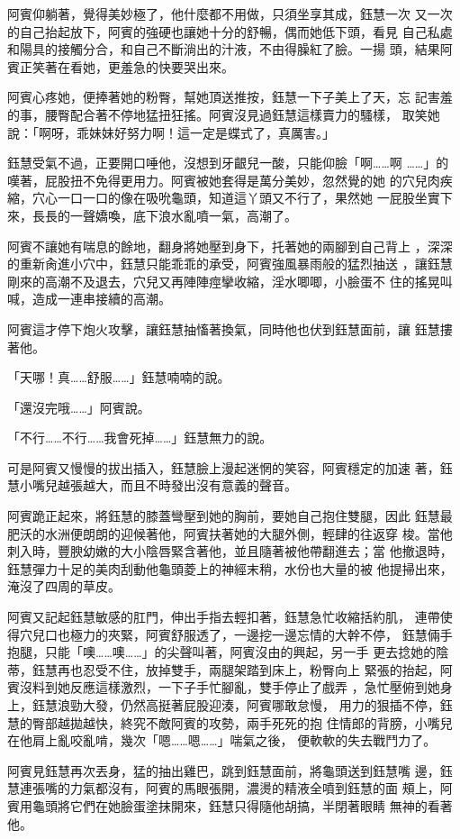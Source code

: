 阿賓仰躺著，覺得美妙極了，他什麼都不用做，只須坐享其成，鈺慧一次
又一次的自己抬起放下，阿賓的強硬也讓她十分的舒暢，偶而她低下頭，看見
自己私處和陽具的接觸分合，和自己不斷淌出的汁液，不由得臊紅了臉。一揚
頭，結果阿賓正笑著在看她，更羞急的快要哭出來。

阿賓心疼她，便捧著她的粉臀，幫她頂送推按，鈺慧一下子美上了天，忘
記害羞的事，腰臀配合著不停地猛扭狂搖。阿賓沒見過鈺慧這樣賣力的騷樣，
取笑她說：「啊呀，乖妹妹好努力啊！這一定是蝶式了，真厲害。」

鈺慧受氣不過，正要開口唾他，沒想到牙齦兒一酸，只能仰臉「啊……啊
……」的嘆著，屁股扭不免得更用力。阿賓被她套得是萬分美妙，忽然覺的她
的穴兒肉疾縮，穴心一口一口的像在吸吮龜頭，知道這丫頭又不行了，果然她
一屁股坐實下來，長長的一聲嬌喚，底下浪水亂噴一氣，高潮了。

阿賓不讓她有喘息的餘地，翻身將她壓到身下，托著她的兩腳到自己背上
，深深的重新肏進小穴中，鈺慧只能乖乖的承受，阿賓強風暴雨般的猛烈抽送
，讓鈺慧剛來的高潮不及退去，穴兒又再陣陣痙攣收縮，淫水唧唧，小臉蛋不
住的搖晃叫喊，造成一連串接續的高潮。

阿賓這才停下炮火攻擊，讓鈺慧抽慉著換氣，同時他也伏到鈺慧面前，讓
鈺慧摟著他。

「天哪！真……舒服……」鈺慧喃喃的說。

「還沒完哦……」阿賓說。

「不行……不行……我會死掉……」鈺慧無力的說。

可是阿賓又慢慢的拔出插入，鈺慧臉上漫起迷惘的笑容，阿賓穩定的加速
著，鈺慧小嘴兒越張越大，而且不時發出沒有意義的聲音。

阿賓跪正起來，將鈺慧的膝蓋彎壓到她的胸前，要她自己抱住雙腿，因此
鈺慧最肥沃的水洲便朗朗的迎候著他，阿賓扶著她的大腿外側，輕肆的往返穿
梭。當他刺入時，豐腴幼嫩的大小陰唇緊含著他，並且隨著被他帶翻進去；當
他撤退時，鈺慧彈力十足的美肉刮動他龜頭菱上的神經末稍，水份也大量的被
他提掃出來，淹沒了四周的草皮。

阿賓又記起鈺慧敏感的肛門，伸出手指去輕扣著，鈺慧急忙收縮括約肌，
連帶使得穴兒口也極力的夾緊，阿賓舒服透了，一邊挖一邊忘情的大幹不停，
鈺慧倆手抱腿，只能「噢……噢……」的尖聲叫著，阿賓沒由的興起，另一手
更去捻她的陰蒂，鈺慧再也忍受不住，放掉雙手，兩腿架踏到床上，粉臀向上
緊張的抬起，阿賓沒料到她反應這樣激烈，一下子手忙腳亂，雙手停止了戲弄
，急忙壓俯到她身上，鈺慧浪勁大發，仍然高挺著屁股迎湊，阿賓哪敢怠慢，
用力的狠插不停，鈺慧的臀部越拋越快，終究不敵阿賓的攻勢，兩手死死的抱
住情郎的背膀，小嘴兒在他肩上亂咬亂啃，幾次「嗯……嗯……」喘氣之後，
便軟軟的失去戰鬥力了。

阿賓見鈺慧再次丟身，猛的抽出雞巴，跳到鈺慧面前，將龜頭送到鈺慧嘴
邊，鈺慧連張嘴的力氣都沒有，阿賓的馬眼張開，濃燙的精液全噴到鈺慧的面
頰上，阿賓用龜頭將它們在她臉蛋塗抹開來，鈺慧只得隨他胡搞，半閉著眼睛
無神的看著他。

